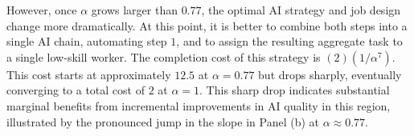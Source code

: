 \begin{example}
However, once $\alpha$ grows larger than $0.77$, the optimal AI strategy and job design change more dramatically.  
At this point, it is better to combine both steps into a single AI chain, automating step $1$, and to assign the resulting aggregate task to a single low-skill worker. 
The completion cost of this strategy is $(2)(1/\alpha^7)$. 
This cost starts at approximately $12.5$ at $\alpha = 0.77$ but drops sharply, eventually converging to a total cost of $2$ at $\alpha = 1$. 
This sharp drop indicates substantial marginal benefits from incremental improvements in AI quality in this region, illustrated by the pronounced jump in the slope in Panel (b) at $\alpha \approx 0.77$.
\end{example}